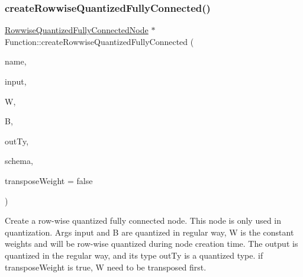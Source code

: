 \subsubsection{\texorpdfstring{create\+Rowwise\+Quantized\+Fully\+Connected()}{createRowwiseQuantizedFullyConnected()}}
{\footnotesize\ttfamily \hyperlink{classglow_1_1_rowwise_quantized_fully_connected_node}{Rowwise\+Quantized\+Fully\+Connected\+Node} $\ast$ Function\+::create\+Rowwise\+Quantized\+Fully\+Connected (\begin{DoxyParamCaption}\item[{llvm\+::\+String\+Ref}]{name,  }\item[{\hyperlink{structglow_1_1_node_value}{Node\+Value}}]{input,  }\item[{\hyperlink{classglow_1_1_constant}{Constant} $\ast$}]{W,  }\item[{\hyperlink{structglow_1_1_node_value}{Node\+Value}}]{B,  }\item[{\hyperlink{structglow_1_1_type}{Type\+Ref}}]{out\+Ty,  }\item[{quantization\+::\+Schema}]{schema,  }\item[{bool}]{transpose\+Weight = {\ttfamily false} }\end{DoxyParamCaption})}

Create a row-\/wise quantized fully connected node. This node is only used in quantization. Args {\ttfamily input} and {\ttfamily B} are quantized in regular way, {\ttfamily W} is the constant weights and will be row-\/wise quantized during node creation time. The output is quantized in the regular way, and its type {\ttfamily out\+Ty} is a quantized type. if {\ttfamily transpose\+Weight} is true, {\ttfamily W} need to be transposed first. \mbox{\label{classglow_1_1_function_a336683b0ec8e06e084caec12f60142fd}} 
